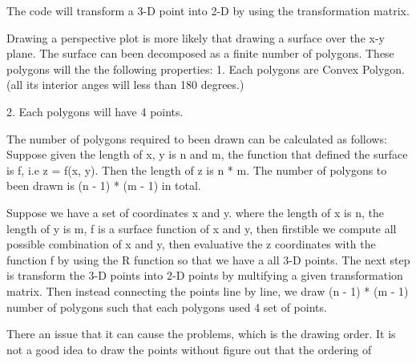 \documentclass[a4paper,10pt]{article}
\begin{document}
The code will transform a 3-D point  into 2-D by using the transformation matrix.

Drawing a perspective plot is more likely that drawing a surface over the x-y plane. The surface can been decomposed as a finite number of polygons. These polygons will the the following properties:
1. Each polygons are Convex Polygon. (all its interior anges will less than 180 degrees.)

2. Each polygons will have 4 points.

The number of polygons required to been drawn can be calculated as follows:
Suppose given the length of x, y is n and m, the function that defined the surface is f, i.e z = f(x, y).
Then the length of z is n * m. The number of polygons to been drawn is (n - 1) * (m - 1) in total.

Suppose we have a set of coordinates x and y. where the length of x is n, the length of y is m, f is a surface function of x and y, then firstible we compute all possible combination of x and y, then evaluative the z coordinates with the function f by using the R function  so that we have a all 3-D points. The next step is transform the 3-D points into 2-D points by multifying a given transformation matrix. Then instead connecting the points line by line, we draw (n - 1) * (m - 1) number of polygons such that each polygons used 4 set of points.

There an issue that it can cause the problems, which is the drawing order. It is not a good idea to draw the points without figure out that the ordering of 
\end{document}
